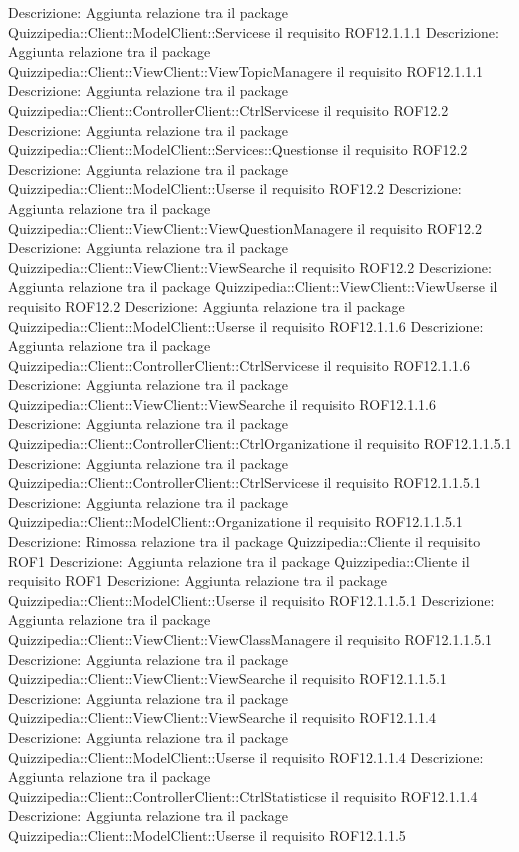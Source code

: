 Descrizione: Aggiunta relazione tra il package Quizzipedia::Client::ModelClient::Servicese il requisito ROF12.1.1.1 
Descrizione: Aggiunta relazione tra il package Quizzipedia::Client::ViewClient::ViewTopicManagere il requisito ROF12.1.1.1 
Descrizione: Aggiunta relazione tra il package Quizzipedia::Client::ControllerClient::CtrlServicese il requisito ROF12.2 
Descrizione: Aggiunta relazione tra il package Quizzipedia::Client::ModelClient::Services::Questionse il requisito ROF12.2 
Descrizione: Aggiunta relazione tra il package Quizzipedia::Client::ModelClient::Userse il requisito ROF12.2 
Descrizione: Aggiunta relazione tra il package Quizzipedia::Client::ViewClient::ViewQuestionManagere il requisito ROF12.2 
Descrizione: Aggiunta relazione tra il package Quizzipedia::Client::ViewClient::ViewSearche il requisito ROF12.2 
Descrizione: Aggiunta relazione tra il package Quizzipedia::Client::ViewClient::ViewUserse il requisito ROF12.2 
Descrizione: Aggiunta relazione tra il package Quizzipedia::Client::ModelClient::Userse il requisito ROF12.1.1.6 
Descrizione: Aggiunta relazione tra il package Quizzipedia::Client::ControllerClient::CtrlServicese il requisito ROF12.1.1.6 
Descrizione: Aggiunta relazione tra il package Quizzipedia::Client::ViewClient::ViewSearche il requisito ROF12.1.1.6 
Descrizione: Aggiunta relazione tra il package Quizzipedia::Client::ControllerClient::CtrlOrganizatione il requisito ROF12.1.1.5.1 
Descrizione: Aggiunta relazione tra il package Quizzipedia::Client::ControllerClient::CtrlServicese il requisito ROF12.1.1.5.1 
Descrizione: Aggiunta relazione tra il package Quizzipedia::Client::ModelClient::Organizatione il requisito ROF12.1.1.5.1 
Descrizione: Rimossa relazione tra il package Quizzipedia::Cliente il requisito ROF1 
Descrizione: Aggiunta relazione tra il package Quizzipedia::Cliente il requisito ROF1 
Descrizione: Aggiunta relazione tra il package Quizzipedia::Client::ModelClient::Userse il requisito ROF12.1.1.5.1 
Descrizione: Aggiunta relazione tra il package Quizzipedia::Client::ViewClient::ViewClassManagere il requisito ROF12.1.1.5.1 
Descrizione: Aggiunta relazione tra il package Quizzipedia::Client::ViewClient::ViewSearche il requisito ROF12.1.1.5.1 
Descrizione: Aggiunta relazione tra il package Quizzipedia::Client::ViewClient::ViewSearche il requisito ROF12.1.1.4 
Descrizione: Aggiunta relazione tra il package Quizzipedia::Client::ModelClient::Userse il requisito ROF12.1.1.4 
Descrizione: Aggiunta relazione tra il package Quizzipedia::Client::ControllerClient::CtrlStatisticse il requisito ROF12.1.1.4 
Descrizione: Aggiunta relazione tra il package Quizzipedia::Client::ModelClient::Userse il requisito ROF12.1.1.5 

